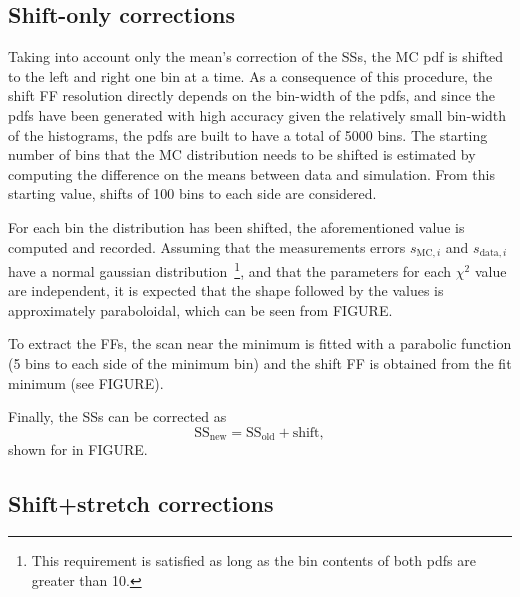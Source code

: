 \subsection{Shift-only corrections}

Taking into account only the mean's correction of the \acp{SS}, the \ac{MC} \ac{pdf} is shifted to the left and right one bin at a time. As a consequence of this procedure, the shift \ac{FF} resolution directly depends on the bin-width of the \acp{pdf}, and since the \acp{pdf} have been generated with high accuracy given the relatively small bin-width of the histograms, the \acp{pdf} are built to have a total of 5000 bins. The starting number of bins that the \ac{MC} distribution needs to be shifted is estimated by computing the difference on the means between data and simulation. From this starting value, shifts of 100 bins to each side are considered.

For each bin the distribution has been shifted, the aforementioned \chisq value is computed and recorded. Assuming that the measurements errors \(s_{\text{MC},i}\) and \(s_{\text{data},i}\) have a normal gaussian distribution~\footnote{This requirement is satisfied as long as the bin contents of both \acp{pdf} are greater than 10.}, and that the parameters for each \(\chi^2\) value are independent, it is expected that the shape followed by the \chisq values is approximately paraboloidal, which can be seen from FIGURE.

To extract the \acp{FF}, the \chisq scan near the minimum is fitted with a parabolic function (5 bins to each side of the minimum bin) and the shift \ac{FF} is obtained from the fit minimum (see FIGURE).

Finally, the \acp{SS} can be corrected as
\[
	\text{SS}_{\text{new}} = \text{SS}_{\text{old}} + \text{shift},
\]
shown for \fside in FIGURE.


\subsection{Shift+stretch corrections}

